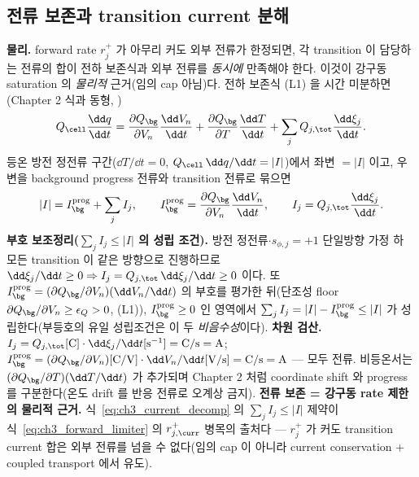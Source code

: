 \subsection{전류 보존과 transition current 분해}\label{sec:ch3_current}
\textbf{물리.} forward rate $r_j^+$ 가 아무리 커도 외부 전류가 한정되면, 각 transition 이 담당하는 전류의 합이
전하 보존식과 외부 전류를 \emph{동시에} 만족해야 한다. 이것이 강구동 saturation 의 \emph{물리적} 근거(임의 cap
아님)다. 전하 보존식 (L1) 을 시간 미분하면(Chapter 2 식과 동형, )
\begin{equation}
Q_\cell\frac{\dd q}{\dd t}=\frac{\partial Q_\bg}{\partial V_n}\frac{\dd V_n}{\dd t}+\frac{\partial Q_\bg}{\partial T}\frac{\dd T}{\dd t}+\sum_j Q_{j,\tot}\frac{\dd\xi_j}{\dd t}.
\label{eq:ch3_current_balance}
\end{equation}
등온 방전 정전류 구간($\dd T/\dd t=0$, $Q_\cell\,\dd q/\dd t=|I|$)에서 좌변 $=|I|$ 이고, 우변을 background
progress 전류와 transition 전류로 묶으면
\begin{equation}
|I|=I_\bg^{\mathrm{prog}}+\sum_j I_j,\qquad I_\bg^{\mathrm{prog}}=\frac{\partial Q_\bg}{\partial V_n}\frac{\dd V_n}{\dd t},\qquad I_j=Q_{j,\tot}\frac{\dd\xi_j}{\dd t}.
\label{eq:ch3_current_decomp}
\end{equation}
\textbf{부호 보조정리($\sum_j I_j\le|I|$ 의 성립 조건).} 방전 정전류$\cdot$$s_{\phi,j}=+1$ 단일방향 가정 하
모든 transition 이 같은 방향으로 진행하므로 $\dd\xi_j/\dd t\ge0\Rightarrow I_j=Q_{j,\tot}\,\dd\xi_j/\dd t\ge0$ 이다.
또 $I_\bg^{\mathrm{prog}}=(\partial Q_\bg/\partial V_n)(\dd V_n/\dd t)$ 의 부호를 평가한 뒤(단조성 floor
$\partial Q_\bg/\partial V_n\ge\epsilon_Q>0$, (L1)), $I_\bg^{\mathrm{prog}}\ge0$ 인 영역에서
$\sum_j I_j=|I|-I_\bg^{\mathrm{prog}}\le|I|$ 가 성립한다(부등호의 유일 성립조건은 이 두 \emph{비음수성}이다).
\textbf{차원 검산.} $I_j=Q_{j,\tot}[\mathrm C]\cdot\dd\xi_j/\dd t[\mathrm{s^{-1}}]=\mathrm{C/s}=\mathrm A$;
$I_\bg^{\mathrm{prog}}=(\partial Q_\bg/\partial V_n)[\mathrm{C/V}]\cdot\dd V_n/\dd t[\mathrm{V/s}]=\mathrm{C/s}=\mathrm A$
— 모두 전류. 비등온서는 $(\partial Q_\bg/\partial T)(\dd T/\dd t)$ 가 추가되며 Chapter 2 처럼 coordinate shift
와 progress 를 구분한다(온도 drift 를 반응 전류로 오계상 금지).
\textbf{전류 보존 = 강구동 rate 제한의 물리적 근거.} 식~\eqref{eq:ch3_current_decomp} 의 $\sum_j I_j\le|I|$
제약이 식~\eqref{eq:ch3_forward_limiter} 의 $r_{j,\curr}^+$ 병목의 출처다 — $r_j^+$ 가 커도 transition current
합은 외부 전류를 넘을 수 없다(임의 cap 이 아니라 current conservation + coupled transport 에서 유도).

